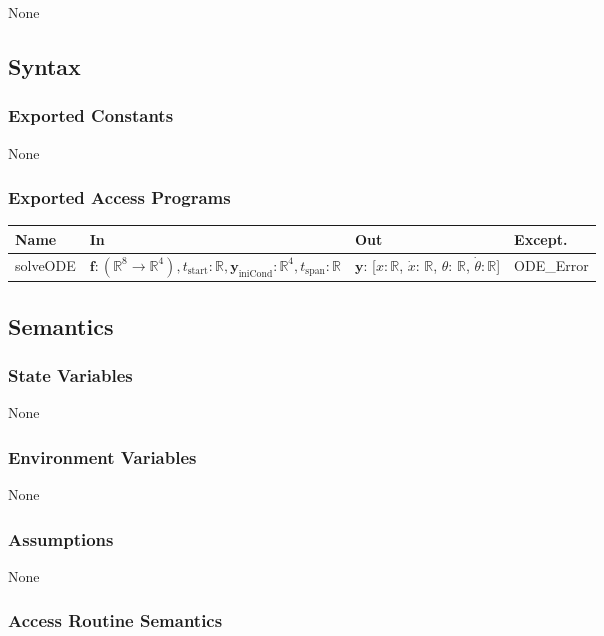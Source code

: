 \documentclass[12pt, titlepage]{article}
\begin{document}
None
\subsection{Syntax}

\subsubsection{Exported Constants}
None
\subsubsection{Exported Access Programs}

\begin{center}
\begin{tabular}{p{2.5cm} >{\raggedright\arraybackslash}p{8cm} >{\raggedright\arraybackslash}p{2.43cm} p{2cm}}
  \hline
  \textbf{Name} & \textbf{In} & \textbf{Out} & \textbf{Except.} \\
  \hline
  solveODE & $\textbf{f}: (\mathbb{R}^{8} \rightarrow \mathbb{R}^4),  t_\text{start}: \mathbb{R}, \textbf{y}_\text{iniCond}: \mathbb{R}^4, t_\text{span}: \mathbb{R}$ & $\textbf{y}$: [$x$$: \mathbb{R}$, $\dot{x}$: $\mathbb{R}$, $\theta$: $\mathbb{R}$, $\dot{\theta}$$: \mathbb{R}$] & ODE\_Error\\
 
\end{tabular}
\end{center}


\subsection{Semantics}

\subsubsection{State Variables}
None
\subsubsection{Environment Variables}
None
\subsubsection{Assumptions}
None

\subsubsection{Access Routine Semantics}
\end{document}
